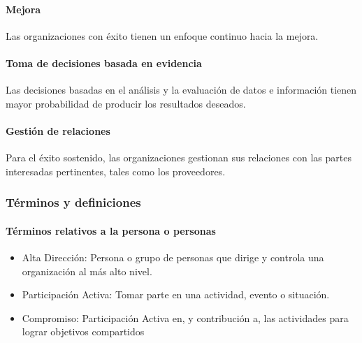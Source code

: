 		\paragraph{Mejora}
			Las organizaciones con éxito tienen un enfoque continuo hacia la mejora.
		
		\paragraph{Toma de decisiones basada en evidencia}
			Las decisiones basadas en el análisis y la evaluación de datos e información tienen mayor probabilidad
			de producir los resultados deseados.
		
		\paragraph{Gestión de relaciones}
			Para el éxito sostenido, las organizaciones gestionan sus relaciones con las partes interesadas
			pertinentes, tales como los proveedores.
			
		\newpage
		\thispagestyle{plain}
	
	\subsubsection{Términos y definiciones}
		\paragraph{Términos relativos a la persona o personas}
			\begin{itemize}
				\item Alta Dirección: Persona o grupo de personas que dirige y controla una organización al más alto nivel.
				
				\item Participación Activa: Tomar parte en una actividad, evento o situación.
				
				\item Compromiso: Participación Activa en, y contribución a, las actividades para lograr objetivos compartidos
			\end{itemize}
		
